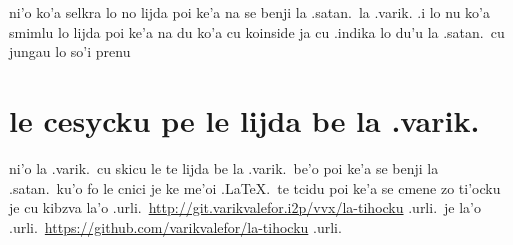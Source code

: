 \documentclass{article}
\begin{document}
ni'o ko'a selkra lo no lijda poi ke'a na se benji la .satan.\ la .varik.  .i lo nu ko'a smimlu lo lijda poi ke'a na du ko'a cu koinside ja cu .indika lo du'u la .satan.\ cu jungau lo so'i prenu

\section{le cesycku pe le lijda be la .varik.}
ni'o la .varik.\ cu skicu le te lijda be la .varik.\ be'o poi ke'a se benji la .satan.\ ku'o fo le cnici je ke me'oi .\LaTeX.\ te tcidu poi ke'a se cmene zo ti'ocku je cu kibzva la'o .urli.\ \url{http://git.varikvalefor.i2p/vvx/la-tihocku} .urli.\ je la'o .urli.\ \url{https://github.com/varikvalefor/la-tihocku} .urli.
\end{document}
